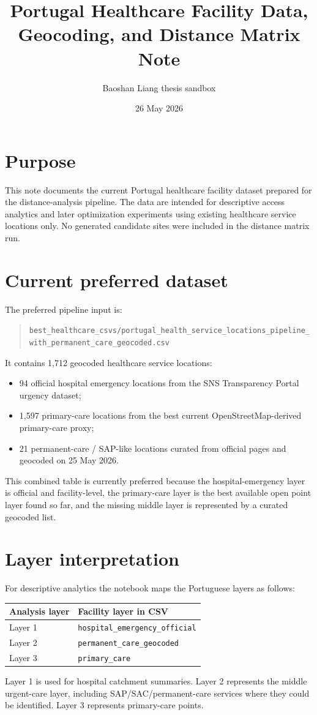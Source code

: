 \documentclass[11pt]{article}
\title{Portugal Healthcare Facility Data, Geocoding, and Distance Matrix Note}
\author{Baoshan Liang thesis sandbox}
\date{26 May 2026}
\begin{document}
\maketitle

\section*{Purpose}
This note documents the current Portugal healthcare facility dataset prepared for the distance-analysis pipeline. The data are intended for descriptive access analytics and later optimization experiments using existing healthcare service locations only. No generated candidate sites were included in the distance matrix run.

\section*{Current preferred dataset}
The preferred pipeline input is:
\begin{quote}
\texttt{best\_healthcare\_csvs/portugal\_health\_service\_locations\_pipeline\_with\_permanent\_care\_geocoded.csv}
\end{quote}
It contains 1,712 geocoded healthcare service locations:
\begin{itemize}[leftmargin=*]
  \item 94 official hospital emergency locations from the SNS Transparency Portal urgency dataset;
  \item 1,597 primary-care locations from the best current OpenStreetMap-derived primary-care proxy;
  \item 21 permanent-care / SAP-like locations curated from official pages and geocoded on 25 May 2026.
\end{itemize}
This combined table is currently preferred because the hospital-emergency layer is official and facility-level, the primary-care layer is the best available open point layer found so far, and the missing middle layer is represented by a curated geocoded list.

\section*{Layer interpretation}
For descriptive analytics the notebook maps the Portuguese layers as follows:
\begin{center}
\begin{tabular}{ll}
\toprule
Analysis layer & Facility layer in CSV \\
\midrule
Layer 1 & \texttt{hospital\_emergency\_official} \\
Layer 2 & \texttt{permanent\_care\_geocoded} \\
Layer 3 & \texttt{primary\_care} \\
\bottomrule
\end{tabular}
\end{center}
Layer 1 is used for hospital catchment summaries. Layer 2 represents the middle urgent-care layer, including SAP/SAC/permanent-care services where they could be identified. Layer 3 represents primary-care points.
\end{document}
